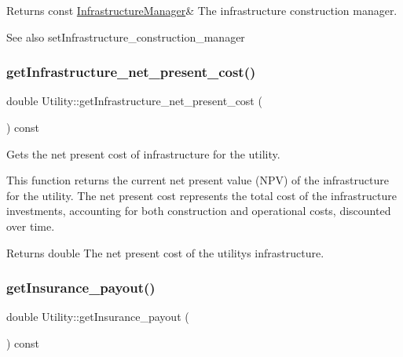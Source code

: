\begin{DoxyReturn}{Returns}
const \mbox{\hyperlink{classInfrastructureManager}{Infrastructure\+Manager}}\& The infrastructure construction manager.
\end{DoxyReturn}
\begin{DoxySeeAlso}{See also}
set\+Infrastructure\+\_\+construction\+\_\+manager 
\end{DoxySeeAlso}
\mbox{\label{classUtility_ab806fee785718cbc82b1963316785448}} 
\subsubsection{\texorpdfstring{get\+Infrastructure\+\_\+net\+\_\+present\+\_\+cost()}{getInfrastructure\_net\_present\_cost()}}
{\footnotesize\ttfamily double Utility\+::get\+Infrastructure\+\_\+net\+\_\+present\+\_\+cost (\begin{DoxyParamCaption}{ }\end{DoxyParamCaption}) const}



Gets the net present cost of infrastructure for the utility. 

This function returns the current net present value (N\+PV) of the infrastructure for the utility. The net present cost represents the total cost of the infrastructure investments, accounting for both construction and operational costs, discounted over time.

\begin{DoxyReturn}{Returns}
double The net present cost of the utility\textquotesingle{}s infrastructure. 
\end{DoxyReturn}
\mbox{\label{classUtility_af789e394a867f007b681c68af3fb3349}} 
\subsubsection{\texorpdfstring{get\+Insurance\+\_\+payout()}{getInsurance\_payout()}}
{\footnotesize\ttfamily double Utility\+::get\+Insurance\+\_\+payout (\begin{DoxyParamCaption}{ }\end{DoxyParamCaption}) const}



